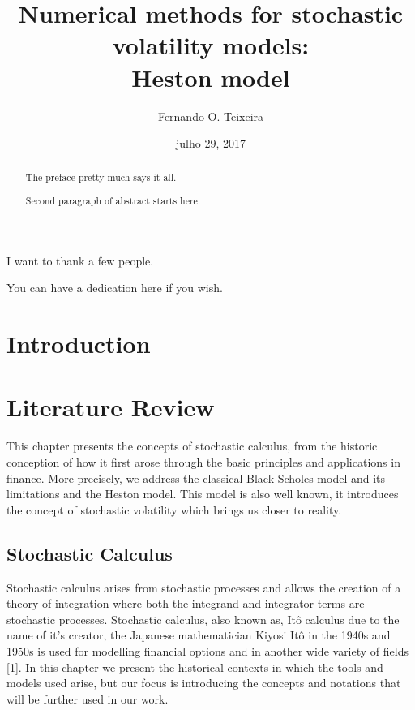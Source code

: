 \documentclass[12pt,twoside]{reedthesis}
\title{\textbf{\Huge{Numerical methods for stochastic volatility models: \\[20pt] Heston model}}}
\author{Fernando O. Teixeira}
\date{julho 29, 2017}
\theoremstyle{definition}
\theoremstyle{definition}
\theoremstyle{remark}
\begin{document}
      \maketitle
  
  \frontmatter %
  \pagestyle{empty} %
      \begin{acknowledgements}
      I want to thank a few people.
    \end{acknowledgements}
  
      \hypersetup{linkcolor=black}
    \setcounter{tocdepth}{2}
    \tableofcontents
  
      \listoftables
  
      \listoffigures
      \begin{abstract}
      The preface pretty much says it all. \par  Second paragraph of abstract
      starts here.
    \end{abstract}
      \begin{dedication}
      You can have a dedication here if you wish.
    \end{dedication}
  \mainmatter %
  \pagestyle{fancyplain} %

  \chapter{Introduction}\label{intro}
  
  \chapter{Literature Review}\label{lt-review}
  
  This chapter presents the concepts of stochastic calculus, from the
  historic conception of how it first arose through the basic principles
  and applications in finance. More precisely, we address the classical
  Black-Scholes model and its limitations and the Heston model. This model
  is also well known, it introduces the concept of stochastic volatility
  which brings us closer to reality.
  
  \section{Stochastic Calculus}\label{stochastic-calculus}
  
  Stochastic calculus arises from stochastic processes and allows the
  creation of a theory of integration where both the integrand and
  integrator terms are stochastic processes. Stochastic calculus, also
  known as, Itô calculus due to the name of it's creator, the Japanese
  mathematician Kiyosi Itô in the 1940s and 1950s is used for modelling
  financial options and in another wide variety of fields {[}1{]}. In this
  chapter we present the historical contexts in which the tools and models
  used arise, but our focus is introducing the concepts and notations that
  will be further used in our work.
  
\end{document}
